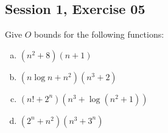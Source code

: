 \subsection{Session 1, Exercise 05}


Give $O$ bounds for the following functions:

\begin{enumerate}[a.)]
    \item $(n^2+8)(n+1)$
    \item $(n\log{n} + n^2)(n^3+2)$
    \item $(n!+2^n)(n^3+\log(n^2+1))$
    \item $(2^n+n^2)(n^3+3^n)$
\end{enumerate}

